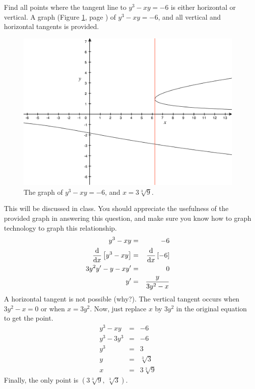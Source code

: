 \documentclass[12pt,addpoints, answers, fleqn]{exam}
\begin{document}
\begin{questions}
\question Find all points where the tangent line to $y^3 - xy = -6$ is either horizontal or vertical. A graph (Figure \ref{fig:graph1803}, page \pageref{fig:graph1803}) of $y^3 - xy = -6$, and all vertical and horizontal tangents is provided.
\begin{figure}[htbp] %
   \centering
   \includegraphics[width=5in]{./graphics/graph1803.pdf} 
   \caption{The graph of $y^3 - xy = -6$, and $x=3\sqrt[3]{9}$.}
   \label{fig:graph1803}
\end{figure}


\begin{solution}
This will be discussed in class. You should appreciate the usefulness of the provided graph in answering this question, and make sure you know how to graph technology to graph this relationship.
\begin{eqnarray*}
y^3 - xy &=& -6\\
\frac{{\rm{d}}}{{\rm{d}}x} \left[y^3 - xy \right] &=& \frac{{\rm{d}}}{{\rm{d}}x} \left[-6 \right]\\
3 y^2 y' - y - x y'&=& 0\\
y'&=& \frac{y}{3y^2-x}
\end{eqnarray*}
A horizontal tangent is not possible (why?). The vertical tangent occurs when $3y^2-x=0$ or when $x=3y^2$. Now, just replace $x$ by $3y^2$ in the original equation to get the point.
\begin{eqnarray*}
y^3 - xy &=& -6\\
y^3 - 3y^3 &=& -6\\
y^3 &=& 3\\
y &=& \sqrt[3]{3}\\
x &=& 3\sqrt[3]{9}
\end{eqnarray*}
Finally, the only point is $\left( 3\sqrt[3]{9}, \  \sqrt[3]{3} \right)$.
\end{solution}

\end{questions}
\end{document}
